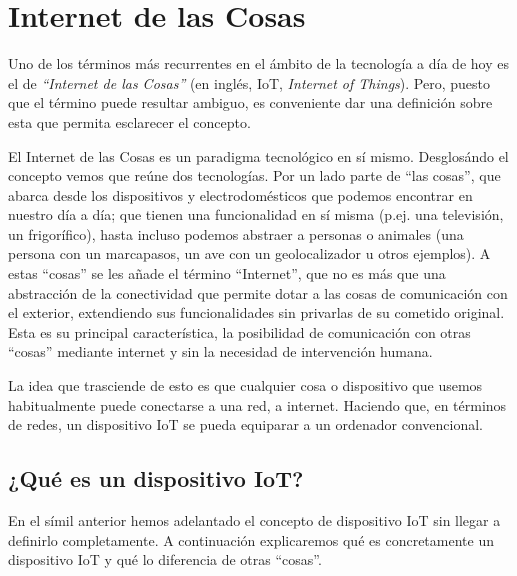 \documentclass[a4paper,10pt]{article}
\begin{document}
\tableofcontents



\newpage

\section{Internet de las Cosas}\label{internet-de-las-cosas}

Uno de los términos más recurrentes en el ámbito de la tecnología a día
de hoy es el de \emph{``Internet de las Cosas''} (en inglés, IoT, \emph{Internet of
Things}). Pero, puesto que el término puede resultar ambiguo, es
conveniente dar una definición sobre esta que permita esclarecer el
concepto.

El Internet de las Cosas es un paradigma tecnológico en sí mismo.
Desglosándo el concepto vemos que reúne dos tecnologías. Por un lado
parte de ``las cosas'', que abarca desde los dispositivos y
electrodomésticos que podemos encontrar en nuestro día a día; que tienen
una funcionalidad en sí misma (p.ej. una televisión, un frigorífico),
hasta incluso podemos abstraer a personas o animales (una persona con un
marcapasos, un ave con un geolocalizador u otros ejemplos\cite{iotagendawebsiteWhatInternetThings}). A estas ``cosas'' se les añade el término
``Internet'', que no es más que una abstracción de la conectividad que
permite dotar a las cosas de comunicación con el exterior, extendiendo
sus funcionalidades sin privarlas de su cometido original. Esta es
su principal característica, la posibilidad de comunicación con otras
``cosas'' mediante internet y sin la necesidad de intervención humana.

La idea que trasciende de esto es que cualquier cosa o dispositivo que
usemos habitualmente puede conectarse a una red, a internet. Haciendo
que, en términos de redes, un dispositivo IoT se pueda equiparar a un
ordenador convencional.

\subsection{¿Qué es un dispositivo
IoT?}\label{quuxe9-es-un-dispositivo-iot}

En el símil anterior hemos adelantado el concepto de dispositivo IoT sin
llegar a definirlo completamente. A continuación explicaremos qué es
concretamente un dispositivo IoT y qué lo diferencia de otras ``cosas''.
\end{document}
